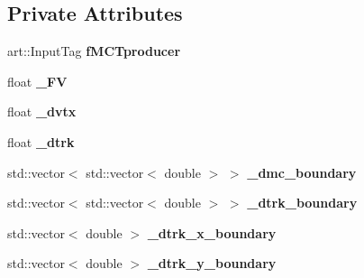\subsection*{Private Attributes}
\begin{DoxyCompactItemize}
\item 
art\+::\+Input\+Tag {\bfseries f\+M\+C\+Tproducer}\hypertarget{classanalysis_1_1ContainmentAnalysis_aeb708c6457c1a19e63dedc84afad8b94}{}\label{classanalysis_1_1ContainmentAnalysis_aeb708c6457c1a19e63dedc84afad8b94}

\item 
float {\bfseries \+\_\+\+FV}\hypertarget{classanalysis_1_1ContainmentAnalysis_a3ecb4264e53ae9f996a7689ae8f78541}{}\label{classanalysis_1_1ContainmentAnalysis_a3ecb4264e53ae9f996a7689ae8f78541}

\item 
float {\bfseries \+\_\+dvtx}\hypertarget{classanalysis_1_1ContainmentAnalysis_a933f497a05e85666d7e10394dc51aacd}{}\label{classanalysis_1_1ContainmentAnalysis_a933f497a05e85666d7e10394dc51aacd}

\item 
float {\bfseries \+\_\+dtrk}\hypertarget{classanalysis_1_1ContainmentAnalysis_a08c17ce66b43feddb596a78202de032c}{}\label{classanalysis_1_1ContainmentAnalysis_a08c17ce66b43feddb596a78202de032c}

\item 
std\+::vector$<$ std\+::vector$<$ double $>$ $>$ {\bfseries \+\_\+dmc\+\_\+boundary}\hypertarget{classanalysis_1_1ContainmentAnalysis_a927f6f2785545fa4cefa315c23cd1088}{}\label{classanalysis_1_1ContainmentAnalysis_a927f6f2785545fa4cefa315c23cd1088}

\item 
std\+::vector$<$ std\+::vector$<$ double $>$ $>$ {\bfseries \+\_\+dtrk\+\_\+boundary}\hypertarget{classanalysis_1_1ContainmentAnalysis_a1f4ccec0a22555c68eccf5c4295c315c}{}\label{classanalysis_1_1ContainmentAnalysis_a1f4ccec0a22555c68eccf5c4295c315c}

\item 
std\+::vector$<$ double $>$ {\bfseries \+\_\+dtrk\+\_\+x\+\_\+boundary}\hypertarget{classanalysis_1_1ContainmentAnalysis_a6b60b98bd35ca4696dd9390dc699f393}{}\label{classanalysis_1_1ContainmentAnalysis_a6b60b98bd35ca4696dd9390dc699f393}

\item 
std\+::vector$<$ double $>$ {\bfseries \+\_\+dtrk\+\_\+y\+\_\+boundary}\hypertarget{classanalysis_1_1ContainmentAnalysis_aa26415fec19cb70a4e8fafac9edb7d23}{}\label{classanalysis_1_1ContainmentAnalysis_aa26415fec19cb70a4e8fafac9edb7d23}


\end{DoxyCompactItemize}
